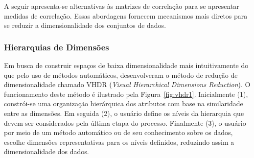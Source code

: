A seguir apresenta-se alternativas às matrizes de correlação
para se apresentar medidas de correlação. Essas abordagens
fornecem mecanismos mais diretos para se reduzir a
dimensionalidade dos conjuntos de dados. 

\subsubsection{Hierarquias de Dimensões}

Em busca de construir espaços de baixa dimensionalidade mais
intuitivamente do que pelo uso de métodos automáticos,
\citet{Yang2003} desenvolveram o método de redução de
dimensionalidade chamado VHDR (\emph{Visual Hierarchical
Dimensions Reduction}). O funcionamento deste método é
ilustrado pela Figura~\ref{fig:vhdr1}. Inicialmente (1),
constrói-se uma organização hierárquica dos atributos com
base na similaridade entre as dimensões. Em seguida (2), o
usuário define os níveis da hierarquia que devem ser
considerados pela última etapa do processo. Finalmente (3), o
usuário por meio de um método automático ou de seu
conhecimento sobre os dados, escolhe dimensões
representativas para os níveis definidos, reduzindo assim a
dimensionalidade dos dados. 


